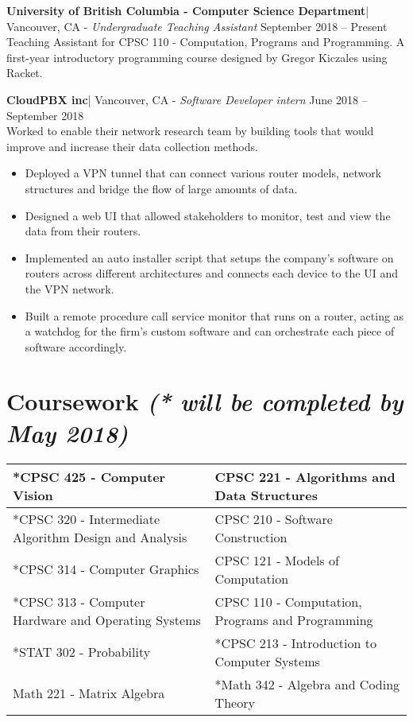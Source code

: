 \documentclass[letter]{res}
\begin{document}
\begin{resume}
\textbf{University of British Columbia - Computer Science Department}| Vancouver, CA \newline 
 - {\sl Undergraduate Teaching Assistant} \hfill September 2018 – Present\\
 Teaching Assistant for CPSC 110 - Computation, Programs and Programming. A first-year introductory programming course designed by Gregor Kiczales using Racket.

\textbf{CloudPBX inc}| Vancouver, CA \newline 
 - {\sl Software Developer intern} \hfill June 2018 – September 2018\\
Worked to enable their network research team by building tools that would improve and increase their data collection methods. \\
 \vspace{-2mm}
 \begin{itemize}
 \item Deployed a VPN tunnel that can connect various router models, network structures and bridge the flow of large amounts of data.
 \item Designed a web UI that allowed stakeholders to monitor, test and view the data from their routers.
 \item Implemented an auto installer script that setups the company's software on routers across different architectures and connects each device to the UI and the VPN network.
 \item Built a remote procedure call service monitor that runs on a router, acting as a watchdog for the firm's custom software and can orchestrate each piece of software accordingly.
 \end{itemize}

\section{Coursework {\sl(* will be completed by May 2018) }} \hfill
\vspace{-2mm}
\begin{tabu} { | X[l] | X[l] |}
 \hline
 *CPSC 425 - Computer Vision & CPSC 221 - Algorithms and Data Structures \\
 \hline
 *CPSC 320 - Intermediate Algorithm Design and Analysis  & CPSC 210 - Software Construction  \\
 \hline
 *CPSC 314 - Computer Graphics & CPSC 121 - Models of Computation \\
 \hline
 *CPSC 313 - Computer Hardware and Operating Systems & CPSC 110 - Computation, Programs and Programming \\
   \hline
 *STAT 302 - Probability & *CPSC 213 - Introduction to Computer Systems \\
  \hline
 Math 221 - Matrix Algebra & *Math 342 - Algebra and Coding Theory \\
\hline
\end{tabu}
 \vspace{-2mm}

\end{resume}
\end{document}
